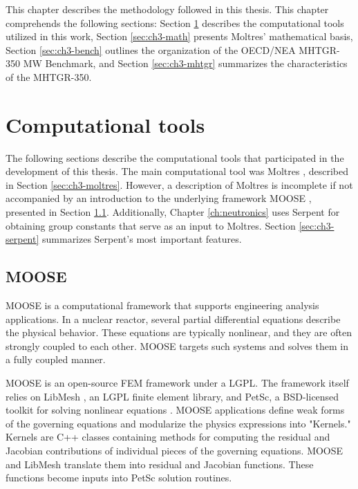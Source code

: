 
This chapter describes the methodology followed in this thesis.
This chapter comprehends the following sections: Section \ref{sec:ch3-tools} describes the computational tools utilized in this work, Section \ref{sec:ch3-math} presents Moltres' mathematical basis, Section \ref{sec:ch3-bench} outlines the organization of the OECD/NEA MHTGR-350 MW Benchmark, and Section \ref{sec:ch3-mhtgr} summarizes the characteristics of the MHTGR-350.

\section{Computational tools}
\label{sec:ch3-tools}

The following sections describe the computational tools that participated in the development of this thesis.
The main computational tool was Moltres \cite{lindsay_introduction_2018}, described in Section \ref{sec:ch3-moltres}.
However, a description of Moltres is incomplete if not accompanied by an introduction to the underlying framework MOOSE \cite{gaston_moose_2009}, presented in Section \ref{sec:ch3-moose}.
Additionally, Chapter \ref{ch:neutronics} uses Serpent \cite{leppanen_development_2007}\cite{leppanen_calculation_2014} for obtaining group constants that serve as an input to Moltres. Section \ref{sec:ch3-serpent} summarizes Serpent's most important features.

\subsection{MOOSE}
\label{sec:ch3-moose}

MOOSE is a computational framework that supports engineering analysis applications.
In a nuclear reactor, several partial differential equations describe the physical behavior.
These equations are typically nonlinear, and they are often strongly coupled to each other.
\gls{MOOSE} targets such systems and solves them in a fully coupled manner.

\gls{MOOSE} is an open-source FEM framework under a \gls{LGPL}.
The framework itself relies on LibMesh \cite{kirk_libmesh_2006}, an LGPL finite element library, and PetSc, a \gls{BSD}-licensed toolkit for solving nonlinear equations \cite{balay_petsc_2016}.
MOOSE applications define weak forms of the governing equations and modularize the physics expressions into "Kernels."
Kernels are C++ classes containing methods for computing the residual and Jacobian contributions of individual pieces of the governing equations.
\gls{MOOSE} and LibMesh translate them into residual and Jacobian functions.
These functions become inputs into PetSc solution routines.

